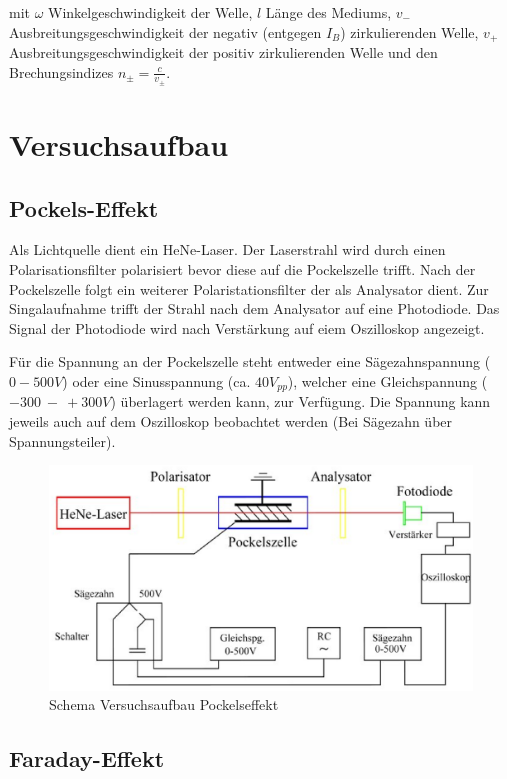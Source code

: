 \documentclass[12pt]{article}
\begin{document}
mit $\omega$ Winkelgeschwindigkeit der Welle, $l$ Länge des Mediums, $v_-$ Ausbreitungsgeschwindigkeit der negativ (entgegen $I_B$) zirkulierenden Welle, $v_+$ Ausbreitungsgeschwindigkeit der positiv zirkulierenden Welle und den Brechungsindizes $n_\pm = \frac{c}{v_\pm}$.




\section{Versuchsaufbau}

\subsection{Pockels-Effekt}

Als Lichtquelle dient ein HeNe-Laser. Der Laserstrahl wird durch einen Polarisationsfilter polarisiert bevor diese auf die Pockelszelle trifft. Nach der Pockelszelle folgt ein weiterer Polaristationsfilter der als Analysator dient. Zur Singalaufnahme trifft der Strahl nach dem Analysator auf eine Photodiode. Das Signal der Photodiode wird nach Verstärkung auf eiem Oszilloskop angezeigt.

Für die Spannung an der Pockelszelle steht entweder eine Sägezahnspannung ($0 - 500V$) oder eine Sinusspannung (ca. $40V_{pp}$), welcher eine Gleichspannung ($-300~-~+300V$) überlagert werden kann, zur Verfügung. Die Spannung kann jeweils auch auf dem Oszilloskop beobachtet werden (Bei Sägezahn über Spannungsteiler).

\begin{figure}[H]
\centering
\includegraphics[width=0.9\linewidth]{pictures/aufbau-pockels.eps}
\caption{Schema Versuchsaufbau Pockelseffekt}
\end{figure}

\subsection{Faraday-Effekt}
\end{document}
